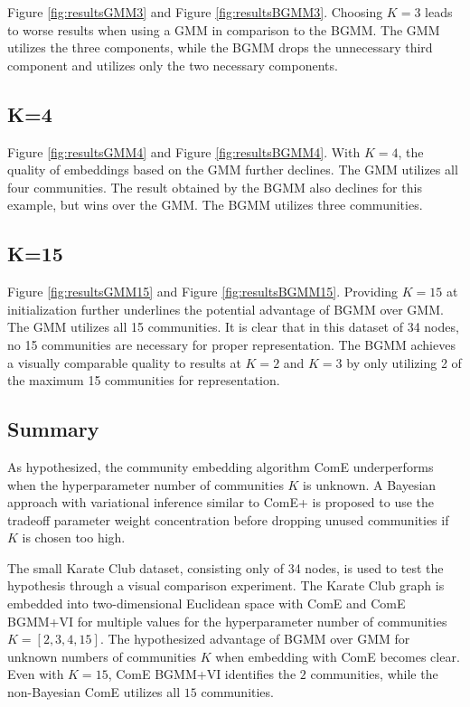 \documentclass[conference]{IEEEtran}
\begin{document}

Figure \ref{fig:resultsGMM3} and Figure \ref{fig:resultsBGMM3}.
Choosing $K=3$ leads to worse results when using a GMM in comparison to the BGMM. The GMM utilizes the three components, while the BGMM drops the unnecessary third component and utilizes only the two necessary components.

\subsection{K=4}


Figure \ref{fig:resultsGMM4} and Figure \ref{fig:resultsBGMM4}.
With $K=4$, the quality of embeddings based on the GMM further declines. The GMM utilizes all four communities. The result obtained by the BGMM also declines for this example, but wins over the GMM. The BGMM utilizes three communities.

\subsection{K=15}


Figure \ref{fig:resultsGMM15} and Figure \ref{fig:resultsBGMM15}.
Providing $K=15$ at initialization further underlines the potential advantage of BGMM over GMM. The GMM utilizes all 15 communities. It is clear that in this dataset of 34 nodes, no 15 communities are necessary for proper representation. The BGMM achieves a visually comparable quality to results at $K=2$ and $K=3$ by only utilizing 2 of the maximum 15 communities for representation.

\subsection{Summary}

As hypothesized, the community embedding algorithm ComE underperforms when the hyperparameter number of communities $K$ is unknown. A Bayesian approach with variational inference similar to ComE+ is proposed to use the tradeoff parameter weight concentration before dropping unused communities if $K$ is chosen too high.

The small Karate Club dataset, consisting only of 34 nodes, is used to test the hypothesis through a visual comparison experiment. The Karate Club graph is embedded into two-dimensional Euclidean space with ComE and ComE BGMM+VI for multiple values for the hyperparameter number of communities $K = [2, 3, 4, 15]$. The hypothesized advantage of BGMM over GMM for unknown numbers of communities $K$ when embedding with ComE becomes clear. Even with $K=15$, ComE BGMM+VI identifies the $2$ communities, while the non-Bayesian ComE utilizes all $15$ communities.

















\end{document}
